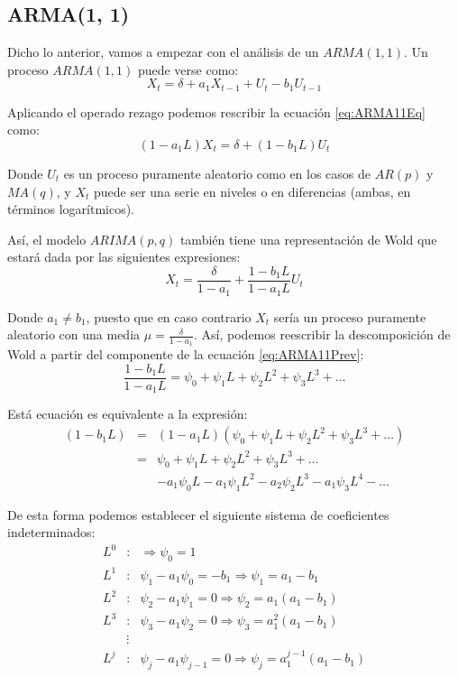 \documentclass[
]{book}
\begin{document}
\hypertarget{arma1-1}{%
\subsection{ARMA(1, 1)}\label{arma1-1}}

Dicho lo anterior, vamos a empezar con el análisis de un \(ARMA(1, 1)\). Un proceso \(ARMA(1, 1)\) puede verse como:
\begin{equation}
    X_t = \delta + a_1 X_{t - 1} + U_t - b_1 U_{t - 1}
    \label{eq:ARMA11Eq}
\end{equation}

Aplicando el operado rezago podemos rescribir la ecuación \eqref{eq:ARMA11Eq} como:
\begin{equation}
    (1 - a_1 L) X_t = \delta + (1 - b_1 L) U_t
\end{equation}

Donde \(U_t\) es un proceso puramente aleatorio como en los casos de \(AR(p)\) y \(MA(q)\), y \(X_t\) puede ser una serie en niveles o en diferencias (ambas, en términos logarítmicos).

Así, el modelo \(ARIMA (p, q)\) también tiene una representación de Wold que estará dada por las siguientes expresiones:
\begin{equation}
    X_t = \frac{\delta}{1 - a_1} + \frac{1 - b_1 L}{1 - a_1 L} U_t
    \label{eq:ARMA11Prev}
\end{equation}

Donde \(a_1 \neq b_1\), puesto que en caso contrario \(X_t\) sería un proceso puramente aleatorio con una media \(\mu = \frac{\delta}{1 - a_1}\). Así, podemos reescribir la descomposición de Wold a partir del componente de la ecuación \eqref{eq:ARMA11Prev}:
\begin{equation}
    \frac{1 - b_1 L}{1 - a_1 L} = \psi_0 + \psi_1 L + \psi_2 L^2 + \psi_3 L^3 + \ldots 
    \label{eq:ARMA11EqWold}
\end{equation}

Está ecuación es equivalente a la expresión:
\begin{eqnarray}
    (1 - b_1 L) & = & (1 - a_1 L)(\psi_0 + \psi_1 L + \psi_2 L^2 + \psi_3 L^3 + \ldots) \nonumber \\
    & = & \psi_0 + \psi_1 L + \psi_2 L^2 + \psi_3 L^3 + \ldots \nonumber \\
    &   & - a_1 \psi_0 L - a_1 \psi_1 L^2 - a_2 \psi_2 L^3 - a_1 \psi_3 L^4 - \ldots \nonumber
\end{eqnarray}

De esta forma podemos establecer el siguiente sistema de coeficientes indeterminados:
\begin{eqnarray*}
    L^0 & : & \Rightarrow \psi_0 = 1 \\
    L^1 & : & \psi_1 - a_1 \psi_0 = - b_1 \Rightarrow \psi_1 = a_1 - b_1 \\
    L^2 & : & \psi_2 - a_1 \psi_1 = 0 \Rightarrow \psi_2 = a_1(a_1 - b_1) \\
    L^3 & : & \psi_3 - a_1 \psi_2 = 0 \Rightarrow \psi_3 = a^2_1(a_1 - b_1) \\
     & \vdots &  \\
    L^j & : & \psi_j - a_1 \psi_{j - 1} = 0 \Rightarrow \psi_j = a^{j - 1}_1(a_1 - b_1)
\end{eqnarray*}
\end{document}
